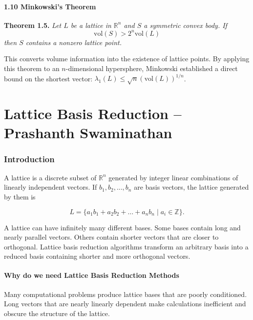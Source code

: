 \documentclass[12pt, a4paper]{article}
\theoremstyle{definition}
\theoremstyle{plain}
\begin{document}
\subsection*{1.10 \quad Minkowski's Theorem}

\noindent \textbf{Theorem 1.5.} \textit{Let $L$ be a lattice in $\mathbb{R}^n$ and $S$ a symmetric convex body. If}
\[
\text{vol}(S) > 2^n\text{vol}(L)
\]
\textit{then $S$ contains a nonzero lattice point.}

\vspace{0.3cm}
This converts volume information into the existence of lattice points. By applying this theorem to an $n$-dimensional hypersphere, Minkowski established a direct bound on the shortest vector: $\lambda_1(L) \leq \sqrt{n}(\text{vol}(L))^{1/n}$.

\newpage


\part{Lattice Basis Reduction -- Prashanth Swaminathan}

\section{Introduction}

A lattice is a discrete subset of $\mathbb{R}^n$ generated by integer linear combinations of linearly independent vectors. If $b_1, b_2, \dots, b_n$ are basis vectors, the lattice generated by them is

\[
L = \{a_1b_1 + a_2b_2 + \dots + a_nb_n \mid a_i \in \mathbb{Z}\}.
\]

A lattice can have infinitely many different bases. Some bases contain long and nearly parallel vectors. Others contain shorter vectors that are closer to orthogonal. Lattice basis reduction algorithms transform an arbitrary basis into a reduced basis containing shorter and more orthogonal vectors.

\subsection{Why do we need Lattice Basis Reduction Methods}

Many computational problems produce lattice bases that are poorly conditioned. Long vectors that are nearly linearly dependent make calculations inefficient and obscure the structure of the lattice.
\end{document}
